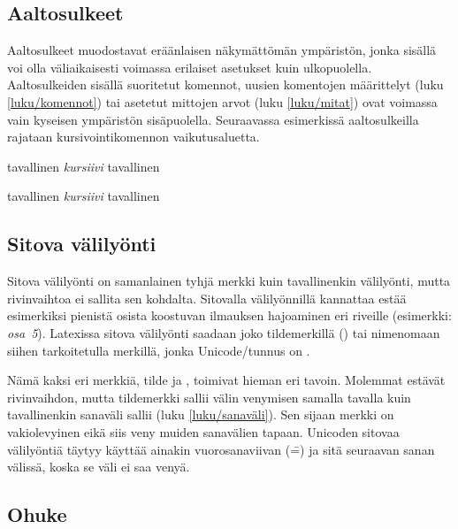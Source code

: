 \subsection{Aaltosulkeet}
\label{luku/aaltosulkeet}

Aaltosulkeet \mbox{\koodi{\{\}}} muodostavat eräänlaisen näkymättömän
ympäristön, jonka sisällä voi olla väliaikaisesti voimassa erilaiset
asetukset kuin ulkopuolella. Aaltosulkeiden sisällä suoritetut komennot,
uusien komentojen määrittelyt (luku \ref{luku/komennot}) tai asetetut
mittojen arvot (luku \ref{luku/mitat}) ovat voimassa vain kyseisen
ympäristön sisäpuolella. Seuraavassa esimerkissä aaltosulkeilla rajataan
kursivointikomennon  vaikutusaluetta.

\begin{koodilohkosis}
tavallinen {\itshape kursiivi} tavallinen
\end{koodilohkosis}

\begin{tulossis}
  tavallinen {\itshape kursiivi} tavallinen
\end{tulossis}

\subsection{Sitova välilyönti}

Sitova välilyönti on samanlainen tyhjä merkki kuin tavallinenkin
välilyönti, mutta rivinvaihtoa ei sallita sen kohdalta. Sitovalla
välilyönnillä kannattaa estää esimerkiksi pienistä osista koostuvan
ilmauksen hajoaminen eri riveille (esimerkki: \emph{osa~5}). Latexissa
sitova välilyönti saadaan joko tildemerkillä (\koodi{\textasciitilde})
tai nimenomaan siihen tarkoitetulla merkillä, jonka Unicode\-/tunnus on
.

Nämä kaksi eri merkkiä, tilde ja , toimivat hieman eri
tavoin. Molemmat estävät rivinvaihdon, mutta tildemerkki sallii välin
venymisen samalla tavalla kuin tavallinenkin sanaväli sallii (luku
\ref{luku/sanaväli}). Sen sijaan merkki  on
vakiolevyinen eikä siis veny muiden sanavälien tapaan. Unicoden sitovaa
välilyöntiä  täytyy käyttää ainakin vuorosanaviivan
(\==) ja sitä seuraavan sanan välissä, koska se väli ei saa venyä.

\subsection{Ohuke}
\label{luku/ohuke}

